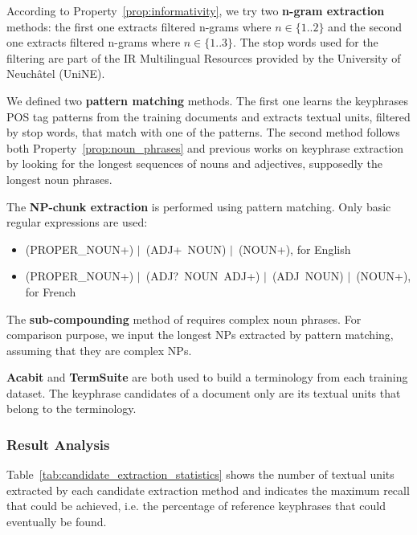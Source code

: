       According to Property~\ref{prop:informativity}, we try two \textbf{n-gram
      extraction} methods: the first one extracts filtered n-grams where
      $n \in \{1..2\}$ and the second one extracts filtered n-grams where
      $n \in \{1..3\}$. The stop words used for the filtering are part of the IR
      Multilingual Resources provided by the University of Neuchâtel (UniNE).

      We defined two \textbf{pattern matching} methods. The first one learns the
      keyphrases POS tag patterns from the training documents and extracts
      textual units, filtered by stop words, that match with one of the
      patterns. The second method follows both Property~\ref{prop:noun_phrases}
      and previous works on keyphrase extraction by looking for the longest
      sequences of nouns and adjectives, supposedly the longest noun phrases.

      The \textbf{NP-chunk extraction} is performed using pattern matching. Only
      basic regular expressions are used:
      \begin{itemize}
        \item{(PROPER\_NOUN+) $|$~(ADJ+~NOUN) $|$~(NOUN+), for English}
        \item{(PROPER\_NOUN+) $|$~(ADJ?~NOUN~ADJ+) $|$~(ADJ~NOUN) $|$~(NOUN+),
              for French}
      \end{itemize}

      The \textbf{sub-compounding} method of
       requires complex noun phrases. For
      comparison purpose, we input the longest NPs extracted by pattern
      matching, assuming that they are complex NPs.

      \textbf{Acabit} and \textbf{TermSuite} are both used to build a
      terminology from each training dataset. The keyphrase candidates of a
      document only are its textual units that belong to the terminology.

    \subsubsection{Result Analysis}
    \label{subsubsec:candidate_extraction_result_analysis}
      Table~\ref{tab:candidate_extraction_statistics} shows the number of
      textual units extracted by each candidate extraction method and indicates
      the maximum recall that could be achieved, i.e. the percentage of
      reference keyphrases that could eventually be found.

